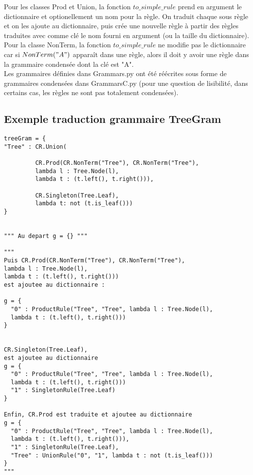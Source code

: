 \documentclass[a4paper, titlepage]{article}
\begin{document}
\begin{itemize}
Pour les classes Prod et Union, la fonction $to\_simple\_rule$ prend
en argument le dictionnaire et optionellement un nom pour la règle.
On traduit chaque sous règle et on les ajoute au dictionnaire, puis
crée une nouvelle règle à partir des règles traduites avec comme clé
le nom fourni en argument (ou la taille du dictionnaire). \\

Pour la classe NonTerm, la fonction $to\_simple\_rule$ ne modifie pas
le dictionnaire car si $NonTerm("A")$ apparaît dans une règle, alors
il doit y avoir une règle dans la grammaire condensée dont la clé est
"A". \\

Les grammaires définies dans Grammars.py ont été réécrites sous forme
de grammaires condensées dans GrammarsC.py (pour une question de
lisibilité, dans certains cas, les règles ne sont pas totalement
condensées).
\pagebreak
\subsection{Exemple traduction grammaire TreeGram}

\begin{lstlisting}
treeGram = {
"Tree" : CR.Union(

         CR.Prod(CR.NonTerm("Tree"), CR.NonTerm("Tree"),
         lambda l : Tree.Node(l),
         lambda t : (t.left(), t.right())),

         CR.Singleton(Tree.Leaf),
         lambda t: not (t.is_leaf()))
}


""" Au depart g = {} """

"""
Puis CR.Prod(CR.NonTerm("Tree"), CR.NonTerm("Tree"),
lambda l : Tree.Node(l),
lambda t : (t.left(), t.right()))
est ajoutee au dictionnaire :
    
g = {
  "0" : ProductRule("Tree", "Tree", lambda l : Tree.Node(l),
  lambda t : (t.left(), t.right()))
}
   
    
CR.Singleton(Tree.Leaf),
est ajoutee au dictionnaire
g = {
  "0" : ProductRule("Tree", "Tree", lambda l : Tree.Node(l),
  lambda t : (t.left(), t.right()))
  "1" : SingletonRule(Tree.Leaf)
}
    
Enfin, CR.Prod est traduite et ajoutee au dictionnaire
g = {
  "0" : ProductRule("Tree", "Tree", lambda l : Tree.Node(l),
  lambda t : (t.left(), t.right())),
  "1" : SingletonRule(Tree.Leaf),
  "Tree" : UnionRule("0", "1", lambda t : not (t.is_leaf()))
}
"""              
\end{lstlisting}



\end{itemize}
\end{document}
